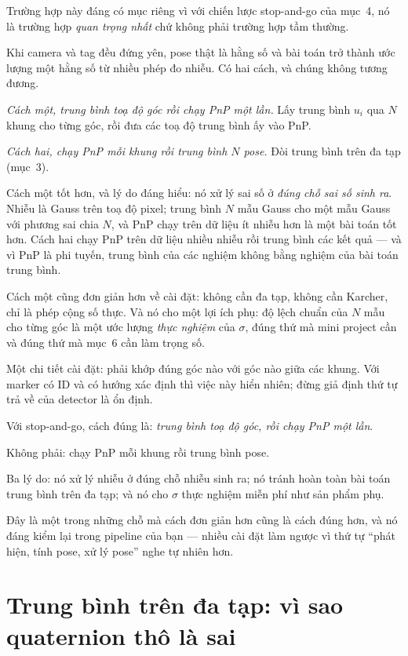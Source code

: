 \documentclass[../../marker.tex]{subfiles}
\begin{document}
Trường hợp này đáng có mục riêng vì với chiến lược stop-and-go của  mục~4, nó là trường hợp \emph{quan trọng nhất} chứ không phải trường hợp tầm thường.

Khi camera và tag đều đứng yên, pose thật là hằng số và bài toán trở thành ước lượng một hằng số từ nhiều phép đo nhiễu. Có hai cách, và chúng không tương đương.

\emph{Cách một, trung bình toạ độ góc rồi chạy PnP một lần.} Lấy trung bình \(u_i\) qua \(N\) khung cho từng góc, rồi đưa các toạ độ trung bình ấy vào PnP.

\emph{Cách hai, chạy PnP mỗi khung rồi trung bình \(N\) pose.} Đòi trung bình trên đa tạp (mục~3).

Cách một tốt hơn, và lý do đáng hiểu: nó xử lý sai số ở \emph{đúng chỗ sai số sinh ra}. Nhiễu là Gauss trên toạ độ pixel; trung bình \(N\) mẫu Gauss cho một mẫu Gauss với phương sai chia \(N\), và PnP chạy trên dữ liệu ít nhiễu hơn là một bài toán tốt hơn. Cách hai chạy PnP trên dữ liệu nhiều nhiễu rồi trung bình các kết quả --- và vì PnP là phi tuyến, trung bình của các nghiệm không bằng nghiệm của bài toán trung bình.

Cách một cũng đơn giản hơn về cài đặt: không cần đa tạp, không cần Karcher, chỉ là phép cộng số thực. Và nó cho một lợi ích phụ: độ lệch chuẩn của \(N\) mẫu cho từng góc là một ước lượng \emph{thực nghiệm} của \(\sigma\), đúng thứ mà  mini project cần và đúng thứ mà  mục~6 cần làm trọng số.

Một chi tiết cài đặt: phải khớp đúng góc nào với góc nào giữa các khung. Với marker có ID và có hướng xác định thì việc này hiển nhiên; đừng giả định thứ tự trả về của detector là ổn định.

\begin{cannho}
Với stop-and-go, cách đúng là: \emph{trung bình toạ độ góc, rồi chạy PnP một lần}.

Không phải: chạy PnP mỗi khung rồi trung bình pose.

Ba lý do: nó xử lý nhiễu ở đúng chỗ nhiễu sinh ra; nó tránh hoàn toàn bài toán trung bình trên đa tạp; và nó cho \(\sigma\) thực nghiệm miễn phí như sản phẩm phụ.

Đây là một trong những chỗ mà cách đơn giản hơn cũng là cách đúng hơn, và nó đáng kiểm lại trong pipeline của bạn --- nhiều cài đặt làm ngược vì thứ tự ``phát hiện, tính pose, xử lý pose'' nghe tự nhiên hơn.
\end{cannho}

\section{Trung bình trên đa tạp: vì sao quaternion thô là sai}
\end{document}
